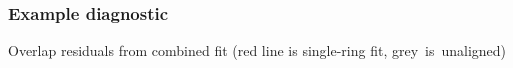 \documentclass[compress]{beamer}
\begin{document}
\begin{frame}
\frametitle{Example diagnostic}
\small

\hspace{-0.5 cm} Overlap residuals from combined fit (red line is single-ring fit, \mbox{grey is unaligned)\hspace{-1 cm}}

\vfill
{}


\end{frame}
\end{document}

